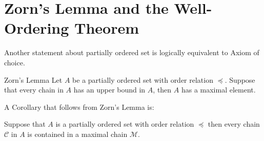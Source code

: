 \documentclass[16pt,a4paper]{article}
\theoremstyle{definition}
\begin{document}
\newpage

\section{Zorn's Lemma and the Well-Ordering Theorem}

Another statement about partially ordered set is logically equivalent to Axiom of choice. 


\begin{thm}{Zorn's Lemma}{}
Let $A$ be a partially ordered set with order relation $\preceq$. Suppose that every chain in $A$ has an upper bound in $A$, then $A$ has a maximal element. 
\end{thm}


A Corollary that follows from Zorn's Lemma is:

\begin{coll}{}{}
Suppose that $A$ is a partially ordered set with order relation $\preceq$ then every chain $\mathcal{C}$ in $A$ is contained in a maximal chain $\mathcal{M}$. 
\end{coll}
\end{document}
